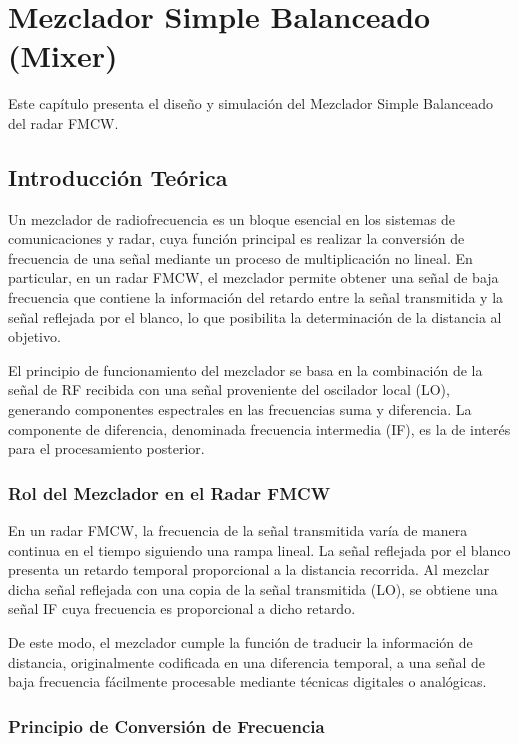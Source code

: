 \chapter{Mezclador Simple Balanceado (Mixer)}
\label{chap:mixer}

Este capítulo presenta el diseño y simulación del Mezclador Simple Balanceado del radar FMCW.

\section{Introducción Teórica}

Un mezclador de radiofrecuencia es un bloque esencial en los sistemas de comunicaciones y radar, cuya función principal es realizar la conversión de frecuencia de una señal mediante un proceso de multiplicación no lineal. En particular, en un radar FMCW, el mezclador permite obtener una señal de baja frecuencia que contiene la información del retardo entre la señal transmitida y la señal reflejada por el blanco, lo que posibilita la determinación de la distancia al objetivo.

El principio de funcionamiento del mezclador se basa en la combinación de la señal de RF recibida con una señal proveniente del oscilador local (LO), generando componentes espectrales en las frecuencias suma y diferencia. La componente de diferencia, denominada frecuencia intermedia (IF), es la de interés para el procesamiento posterior.

\subsection{Rol del Mezclador en el Radar FMCW }

En un radar FMCW, la frecuencia de la señal transmitida varía de manera continua en el tiempo siguiendo una rampa lineal. La señal reflejada por el blanco presenta un retardo temporal proporcional a la distancia recorrida. Al mezclar dicha señal reflejada con una copia de la señal transmitida (LO), se obtiene una señal IF cuya frecuencia es proporcional a dicho retardo.

De este modo, el mezclador cumple la función de traducir la información de distancia, originalmente codificada en una diferencia temporal, a una señal de baja frecuencia fácilmente procesable mediante técnicas digitales o analógicas.

\subsection{Principio de Conversión de Frecuencia}

